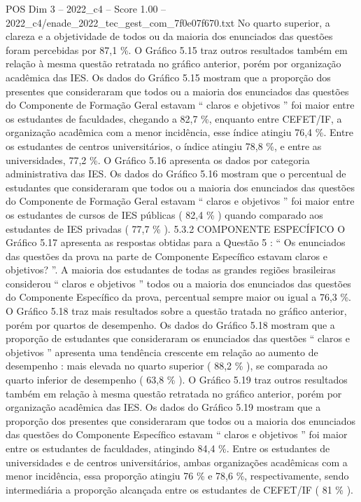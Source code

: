 \begin{textsample}{POS Dim 3 – 2022\_c4 – Score 1.00 – 2022\_c4/enade\_2022\_tec\_gest\_com\_7f0e07f670.txt}
No quarto superior, a clareza e a objetividade de todos ou da maioria dos enunciados das questões foram percebidas por 87,1 \%.
O Gráfico 5.15 traz outros resultados também em relação à mesma questão retratada no gráfico anterior, porém por organização acadêmica das IES.
Os dados do Gráfico 5.15 mostram que a proporção dos presentes que consideraram que todos ou a maioria dos enunciados das questões do Componente de Formação Geral estavam “ claros e objetivos ” foi maior entre os estudantes de faculdades, chegando a 82,7 \%, enquanto entre CEFET/IF, a organização acadêmica com a menor incidência, esse índice atingiu 76,4 \%.
Entre os estudantes de centros universitários, o índice atingiu 78,8 \%, e entre as universidades, 77,2 \%.
O Gráfico 5.16 apresenta os dados por categoria administrativa das IES.
Os dados do Gráfico 5.16 mostram que o percentual de estudantes que consideraram que todos ou a maioria dos enunciados das questões do Componente de Formação Geral estavam “ claros e objetivos ” foi maior entre os estudantes de cursos de IES públicas ( 82,4 \% ) quando comparado aos estudantes de IES privadas ( 77,7 \% ). 5.3.2 COMPONENTE ESPECÍFICO O Gráfico 5.17 apresenta as respostas obtidas para a Questão 5 : “ Os enunciados das questões da prova na parte de Componente Específico estavam claros e objetivos? ”.
A maioria dos estudantes de todas as grandes regiões brasileiras considerou “ claros e objetivos ” todos ou a maioria dos enunciados das questões do Componente Específico da prova, percentual sempre maior ou igual a 76,3 \%.
O Gráfico 5.18 traz mais resultados sobre a questão tratada no gráfico anterior, porém por quartos de desempenho.
Os dados do Gráfico 5.18 mostram que a proporção de estudantes que consideraram os enunciados das questões “ claros e objetivos ” apresenta uma tendência crescente em relação ao aumento de desempenho : mais elevada no quarto superior ( 88,2 \% ), se comparada ao quarto inferior de desempenho ( 63,8 \% ).
O Gráfico 5.19 traz outros resultados também em relação à mesma questão retratada no gráfico anterior, porém por organização acadêmica das IES.
Os dados do Gráfico 5.19 mostram que a proporção dos presentes que consideraram que todos ou a maioria dos enunciados das questões do Componente Específico estavam “ claros e objetivos ” foi maior entre os estudantes de faculdades, atingindo 84,4 \%.
Entre os estudantes de universidades e de centros universitários, ambas organizações acadêmicas com a menor incidência, essa proporção atingiu 76 \% e 78,6 \%, respectivamente, sendo intermediária a proporção alcançada entre os estudantes de CEFET/IF ( 81 \% ).

\end{textsample}
